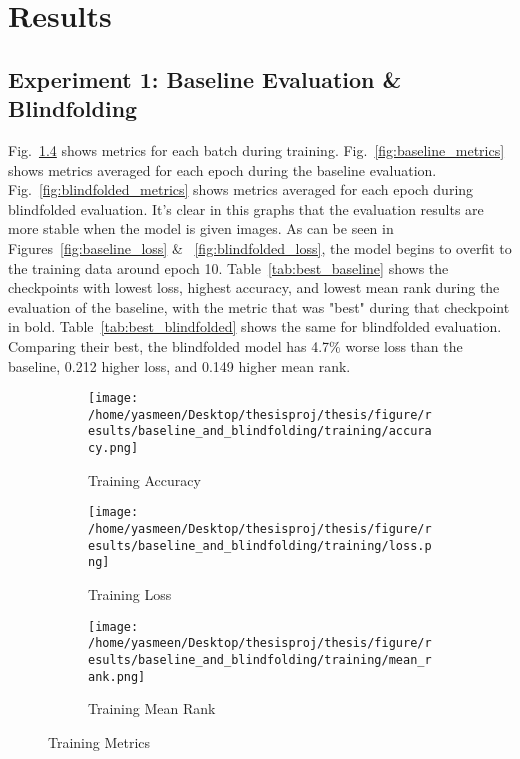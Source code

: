 \chapter{Results}
\section{Experiment 1: Baseline Evaluation \& Blindfolding}
Fig.~\ref{fig:training_metrics} shows metrics for each batch during training. Fig.~\ref{fig:baseline_metrics} shows metrics averaged for each epoch during the baseline evaluation. Fig.~\ref{fig:blindfolded_metrics} shows metrics averaged for each epoch during blindfolded evaluation. It's clear in this graphs that the evaluation results are more stable when the model is given images. As can be seen in Figures~\ref{fig:baseline_loss} \& ~\ref{fig:blindfolded_loss}, the model begins to overfit to the training data around epoch 10. 
Table~\ref{tab:best_baseline} shows the checkpoints with lowest loss, highest accuracy, and lowest mean rank during the evaluation of the baseline, with the metric that was "best" during that checkpoint in bold. Table~\ref{tab:best_blindfolded} shows the same for blindfolded evaluation. Comparing their best, the blindfolded model has 4.7\% worse loss than the baseline, 0.212 higher loss, and 0.149 higher mean rank. 

\begin{figure}[h!]
     \centering
     \begin{subfigure}[b]{0.3\textwidth}
         \centering
         \texttt{[image: /home/yasmeen/Desktop/thesisproj/thesis/figure/results/baseline\_and\_blindfolding/training/accuracy.png]}
         \caption{Training Accuracy}
         \label{fig:training_accuracy}
     \end{subfigure}
     \hfill
     \begin{subfigure}[b]{0.3\textwidth}
         \centering
         \texttt{[image: /home/yasmeen/Desktop/thesisproj/thesis/figure/results/baseline\_and\_blindfolding/training/loss.png]}
         \caption{Training Loss}
         \label{fig:training_loss}
     \end{subfigure}
     \hfill
     \begin{subfigure}[b]{0.3\textwidth}
         \centering
         \texttt{[image: /home/yasmeen/Desktop/thesisproj/thesis/figure/results/baseline\_and\_blindfolding/training/mean\_rank.png]}
         \caption{Training Mean Rank}
         \label{fig:training_mean_rank}
     \end{subfigure}
     \caption{Training Metrics}
     \label{fig:training_metrics}
\end{figure}

